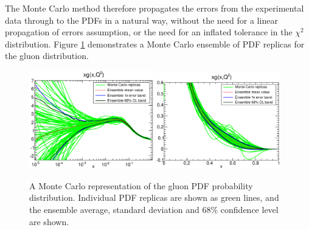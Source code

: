 The Monte Carlo method therefore propagates the errors from the experimental data through to the PDFs in a natural way, without the need for a linear propagation of errors assumption, or the need for an inflated tolerance in the $\chi^2$ distribution. Figure \ref{fig:mcerror} demonstrates a Monte Carlo ensemble of PDF replicas for the gluon distribution.

\begin{figure}[ht]
\centering
\includegraphics[width=0.48\textwidth]{3-PDFdet/figs/pdf_xg_log_rep.eps}
\includegraphics[width=0.48\textwidth]{3-PDFdet/figs/pdf_xg_rep.eps}
\caption[A Monte Carlo representation of the gluon PDF probability distribution]{A Monte Carlo representation of the gluon PDF probability distribution. Individual PDF replicas are shown as green lines, and the ensemble average, standard deviation and 68\% confidence level are shown.}
\label{fig:mcerror}
\end{figure}

%
%
%
%

